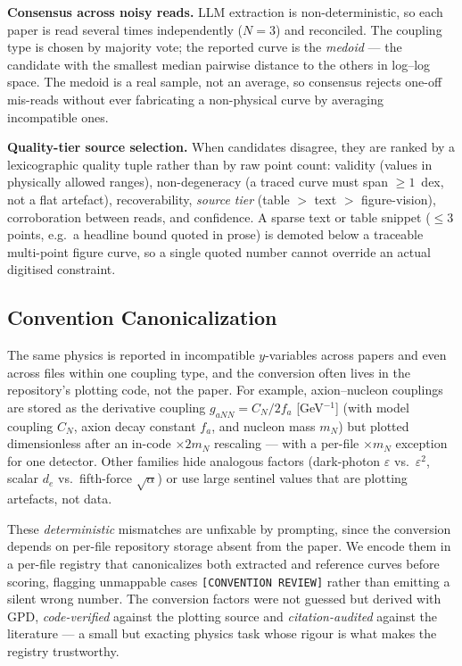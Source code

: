\documentclass{article}
\begin{document}
\textbf{Consensus across noisy reads.}
LLM extraction is non-deterministic, so each paper is read several times independently ($N{=}3$) and reconciled. The coupling type is chosen by majority vote; the reported curve is the \emph{medoid} --- the candidate with the smallest median pairwise distance to the others in log--log space. The medoid is a real sample, not an average, so consensus rejects one-off mis-reads without ever fabricating a non-physical curve by averaging incompatible ones.

\textbf{Quality-tier source selection.}
When candidates disagree, they are ranked by a lexicographic quality tuple rather than by raw point count: validity (values in physically allowed ranges), non-degeneracy (a traced curve must span $\geq 1$~dex, not a flat artefact), recoverability, \emph{source tier} (table $>$ text $>$ figure-vision), corroboration between reads, and confidence. A sparse text or table snippet ($\leq 3$ points, e.g.\ a headline bound quoted in prose) is demoted below a traceable multi-point figure curve, so a single quoted number cannot override an actual digitised constraint.

\subsection{Convention Canonicalization}
\label{sec:conv}

The same physics is reported in incompatible $y$-variables across papers and even across files within one coupling type, and the conversion often lives in the repository's plotting code, not the paper. For example, axion--nucleon couplings are stored as the derivative coupling $g_{aNN}=C_N/2f_a$ [GeV$^{-1}$] (with model coupling $C_N$, axion decay constant $f_a$, and nucleon mass $m_N$) but plotted dimensionless after an in-code $\times 2m_N$ rescaling --- with a per-file $\times m_N$ exception for one detector. Other families hide analogous factors (dark-photon $\varepsilon$ vs.\ $\varepsilon^2$, scalar $d_e$ vs.\ fifth-force $\sqrt{\alpha}$) or use large sentinel values that are plotting artefacts, not data.

These \emph{deterministic} mismatches are unfixable by prompting, since the conversion depends on per-file repository storage absent from the paper. We encode them in a per-file registry that canonicalizes both extracted and reference curves before scoring, flagging unmappable cases \texttt{[CONVENTION REVIEW]} rather than emitting a silent wrong number. The conversion factors were not guessed but derived with GPD, \emph{code-verified} against the plotting source and \emph{citation-audited} against the literature --- a small but exacting physics task whose rigour is what makes the registry trustworthy.
\end{document}
